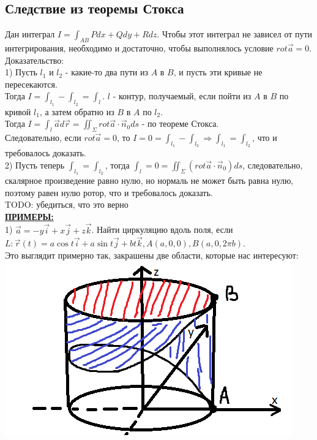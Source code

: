 \documentclass[12pt]{article}
\begin{document}
\subsection{Следствие из теоремы Стокса}
Дан интеграл $I = \int_{AB} Pdx + Qdy + Rdz$. Чтобы этот интеграл не зависел от пути интегрирования, необходимо и достаточно, чтобы выполнялось условие  $rot \overrightarrow{a} = 0$.\\
Доказательство:\\
1) Пусть $l_1$ и $l_2$ - какие-то два пути из $A$ в $B$, и пусть эти кривые не пересекаются.\\
Тогда $I = \int_{l_1} - \int_{l_2} = \int_l$. $l$ - контур, получаемый, если пойти из $A$ в $B$ по кривой $l_1$, а затем обратно из $B$ в $A$ по $l_2$.\\
Тогда $I = \int_l \overrightarrow{a} d \overrightarrow{r} = \iint_{\Sigma} rot \overrightarrow{a} \cdot \overrightarrow{n}_0 ds$ - по теореме Стокса.\\
Следовательно, если $rot \overrightarrow{a} = 0$, то $I = 0 = \int_{l_1} - \int_{l_2} \Rightarrow \int_{l_1} = \int_{l_2}$, что и требовалось доказать.\\
2) Пусть теперь $\int_{l_1} = \int_{l_2}$, тогда $\int_l = 0 = \iint_{\Sigma} (rot \overrightarrow{a} \cdot \overrightarrow{n}_0) ds$, следовательно, скалярное произведение равно нулю, но нормаль не может быть равна нулю, поэтому равен нулю ротор, что и требовалось доказать.\\
TODO: убедиться, что это верно\\
\uline{\textbf{ПРИМЕРЫ:}}\\
1) $\overrightarrow{a} = -y \overrightarrow{i} + x \overrightarrow{j} + z \overrightarrow{k}$. Найти циркуляцию вдоль поля, если\\
$L: \overrightarrow{r}(t) = a \cos t \overrightarrow{i} + a \sin t \overrightarrow{j} + b t \overrightarrow{k}, A(a,0,0), B(a,0,2 \pi b)$.\\
Это выглядит примерно так, закрашены две области, которые нас интересуют:\\
\includegraphics{stokesExample1}\\
\end{document}
